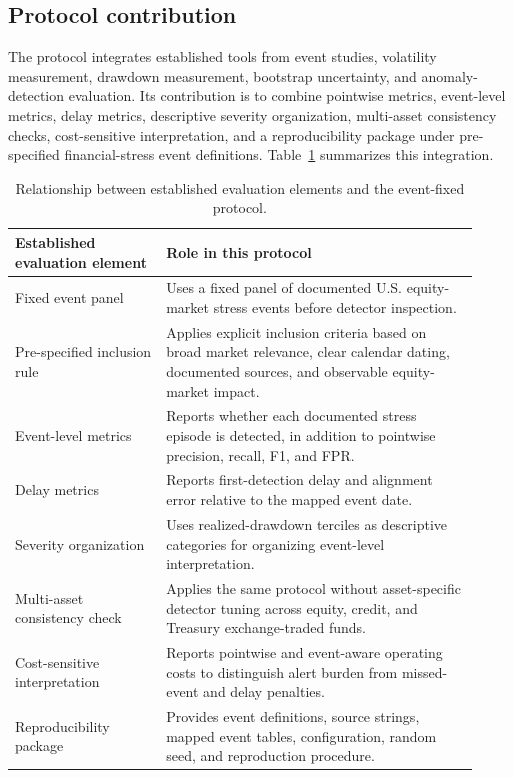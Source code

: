 \documentclass[pdflatex,sn-mathphys-num]{sn-jnl}
\begin{document}
\subsection*{Protocol contribution}
The protocol integrates established tools from event studies, volatility measurement, drawdown measurement, bootstrap uncertainty, and anomaly-detection evaluation. Its contribution is to combine pointwise metrics, event-level metrics, delay metrics, descriptive severity organization, multi-asset consistency checks, cost-sensitive interpretation, and a reproducibility package under pre-specified financial-stress event definitions. Table~\ref{tab:protocol_comparison} summarizes this integration.

\begin{table}[t]
\centering
\caption{Relationship between established evaluation elements and the event-fixed protocol.}
\label{tab:protocol_comparison}
\scriptsize
\begin{tabular}{p{0.30\linewidth}p{0.62\linewidth}}
\toprule
Established evaluation element & Role in this protocol\\
\midrule
Fixed event panel & Uses a fixed panel of documented U.S. equity-market stress events before detector inspection.\\
Pre-specified inclusion rule & Applies explicit inclusion criteria based on broad market relevance, clear calendar dating, documented sources, and observable equity-market impact.\\
Event-level metrics & Reports whether each documented stress episode is detected, in addition to pointwise precision, recall, F1, and FPR.\\
Delay metrics & Reports first-detection delay and alignment error relative to the mapped event date.\\
Severity organization & Uses realized-drawdown terciles as descriptive categories for organizing event-level interpretation.\\
Multi-asset consistency check & Applies the same protocol without asset-specific detector tuning across equity, credit, and Treasury exchange-traded funds.\\
Cost-sensitive interpretation & Reports pointwise and event-aware operating costs to distinguish alert burden from missed-event and delay penalties.\\
Reproducibility package & Provides event definitions, source strings, mapped event tables, configuration, random seed, and reproduction procedure.\\
\bottomrule
\end{tabular}
\end{table}
\end{document}

